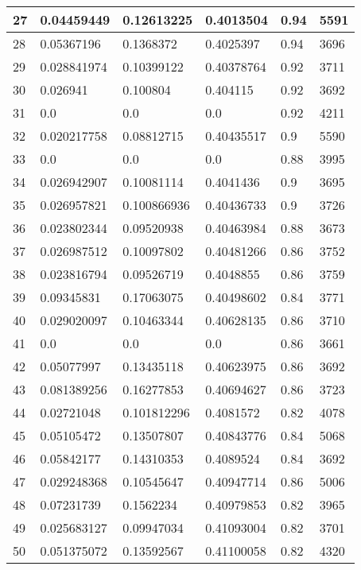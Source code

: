 \begin{longtable}{|l|l|l|l|l|l|}
27 & 0.04459449 & 0.12613225 & 0.4013504 & 0.94 & 5591 \\ \hline 
28 & 0.05367196 & 0.1368372 & 0.4025397 & 0.94 & 3696 \\ \hline 
29 & 0.028841974 & 0.10399122 & 0.40378764 & 0.92 & 3711 \\ \hline 
30 & 0.026941 & 0.100804 & 0.404115 & 0.92 & 3692 \\ \hline 
31 & 0.0 & 0.0 & 0.0 & 0.92 & 4211 \\ \hline 
32 & 0.020217758 & 0.08812715 & 0.40435517 & 0.9 & 5590 \\ \hline 
33 & 0.0 & 0.0 & 0.0 & 0.88 & 3995 \\ \hline 
34 & 0.026942907 & 0.10081114 & 0.4041436 & 0.9 & 3695 \\ \hline 
35 & 0.026957821 & 0.100866936 & 0.40436733 & 0.9 & 3726 \\ \hline 
36 & 0.023802344 & 0.09520938 & 0.40463984 & 0.88 & 3673 \\ \hline 
37 & 0.026987512 & 0.10097802 & 0.40481266 & 0.86 & 3752 \\ \hline 
38 & 0.023816794 & 0.09526719 & 0.4048855 & 0.86 & 3759 \\ \hline 
39 & 0.09345831 & 0.17063075 & 0.40498602 & 0.84 & 3771 \\ \hline 
40 & 0.029020097 & 0.10463344 & 0.40628135 & 0.86 & 3710 \\ \hline 
41 & 0.0 & 0.0 & 0.0 & 0.86 & 3661 \\ \hline 
42 & 0.05077997 & 0.13435118 & 0.40623975 & 0.86 & 3692 \\ \hline 
43 & 0.081389256 & 0.16277853 & 0.40694627 & 0.86 & 3723 \\ \hline 
44 & 0.02721048 & 0.101812296 & 0.4081572 & 0.82 & 4078 \\ \hline 
45 & 0.05105472 & 0.13507807 & 0.40843776 & 0.84 & 5068 \\ \hline 
46 & 0.05842177 & 0.14310353 & 0.4089524 & 0.84 & 3692 \\ \hline 
47 & 0.029248368 & 0.10545647 & 0.40947714 & 0.86 & 5006 \\ \hline 
48 & 0.07231739 & 0.1562234 & 0.40979853 & 0.82 & 3965 \\ \hline 
49 & 0.025683127 & 0.09947034 & 0.41093004 & 0.82 & 3701 \\ \hline 
50 & 0.051375072 & 0.13592567 & 0.41100058 & 0.82 & 4320 \\ \hline 
\end{longtable}